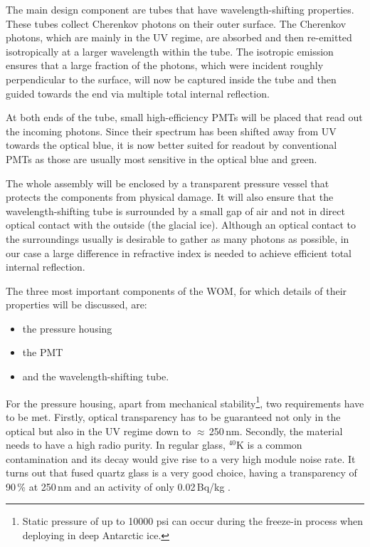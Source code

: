 The main design component are tubes that have wavelength-shifting properties. 
These tubes collect Cherenkov photons on their outer surface. The Cherenkov 
photons, which are mainly in the UV regime, are absorbed and then re-emitted
isotropically at a larger wavelength within the tube. The isotropic emission 
ensures that a large fraction %
of the photons, which were incident roughly perpendicular to the surface, will 
now be captured inside the tube and then guided towards the end via multiple 
total internal reflection.

At both ends of the tube, small high-efficiency PMTs will be placed that read 
out the incoming photons. Since their spectrum has been shifted away from UV 
towards the optical blue, it is now better suited for readout by conventional
PMTs as those are usually most sensitive in the optical blue and green.

The whole assembly will be enclosed by a transparent pressure vessel that 
protects the components from physical damage. It will also ensure that the 
wavelength-shifting tube is surrounded by a small gap of air and not in direct 
optical contact with the outside (\eg the glacial ice). Although an optical 
contact to the surroundings usually is desirable to gather as many photons as 
possible, in our case a large difference in refractive index is needed to
achieve efficient total internal reflection.

The three most important components of the WOM, for which details of their
properties will be discussed, are:

\begin{itemize}
 \item the pressure housing
 \item the PMT
 \item and the wavelength-shifting tube.
\end{itemize}

For the pressure housing, apart from mechanical stability\footnote{Static 
pressure of up to 10000 psi can occur during the freeze-in process when 
deploying in deep Antarctic ice.}, two requirements have to be met. Firstly, 
optical transparency has to be guaranteed not only in the optical but also in 
the UV regime down to $\approx$\,250\,nm. Secondly, the material needs to have a 
high radio purity. In regular glass, $^{40}$K is a common contamination and its
decay would give rise to a very high module noise rate. It turns out that fused 
quartz glass is a very good choice, having a transparency of 90\,\% at 250\,nm 
and an activity of only 0.02\,Bq/kg \cite{quartzprops}.

